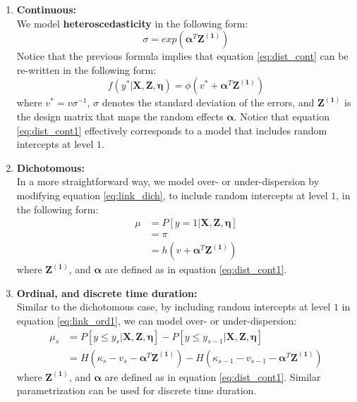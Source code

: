 \begin{enumerate}
	\item \textbf{Continuous:} \\
	We model \textbf{heteroscedasticity} in the following form:
	\begin{equation} \label{eq:het_cont}
		\sigma = exp(\pmb{\alpha}^{T}\mathbf{Z^{(1)}})
	\end{equation}
	Notice that the previous formula implies that equation \ref{eq:dist_cont} can be re-written in the following form:
	\begin{equation} \label{eq:dist_cont1}
			f(y^{*}| \mathbf{X}, \mathbf{Z}, \pmb{\eta}) = \phi(v^{*} + \pmb{\alpha}^{T}\mathbf{Z^{(1)}})
	\end{equation}
	where $v^{*} = v \sigma^{-1}$, $\sigma$ denotes the standard deviation of the errors, and $\mathbf{Z^{(1)}}$ is the design matrix that maps the random effects $\pmb{\alpha}$. Notice that equation \ref{eq:dist_cont1} effectively corresponds to a model that includes random intercepts at level $1$. 
	
	
	
	\item \textbf{Dichotomous:} \\
	In a more straightforward way, we model over- or under-dispersion by modifying equation \ref{eq:link_dich}, to include random intercepts at level $1$, in the following form:
	\begin{equation} \label{eq:link_dich1}
		\begin{split}
			\mu &= P[y=1 | \mathbf{X}, \mathbf{Z}, \pmb{\eta}] \\
			&= \pi \\
			&= h(v + \pmb{\alpha}^{T}\mathbf{Z^{(1)}})
		\end{split}	
	\end{equation}
	where $\mathbf{Z^{(1)}}$, and $\pmb{\alpha}$ are defined as in equation \ref{eq:dist_cont1}.
	
	
	
	\item \textbf{Ordinal, and discrete time duration:} \\
	Similar to the dichotomous case, by including random intercepts at level $1$ in equation \ref{eq:link_ord1}, we can model over- or under-dispersion:
	\begin{equation} \label{eq:link_ord3}
		\begin{split}
			\mu_{s} &= P[y \leq y_{s} | \mathbf{X}, \mathbf{Z}, \pmb{\eta}] - P[y \leq y_{s-1} | \mathbf{X}, \mathbf{Z}, \pmb{\eta}] \\
			&= H(\kappa_{s} - v_{s} - \pmb{\alpha}^{T}\mathbf{Z^{(1)}}) - H(\kappa_{s-1} - v_{s-1} - \pmb{\alpha}^{T}\mathbf{Z^{(1)}})
		\end{split}
	\end{equation}
	where $\mathbf{Z^{(1)}}$, and $\pmb{\alpha}$ are defined as in equation \ref{eq:dist_cont1}. Similar parametrization can be used for discrete time duration.



\end{enumerate}
